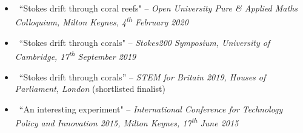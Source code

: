 \documentclass[a4paper]{article}
\begin{document}
\begin{multicols}{2}
\begin{small}
\begin{itemize}
                    \item \faVolumeUp \, ``Stokes drift through coral reefs" -- \emph{Open University Pure \& Applied Maths Colloquium, Milton Keynes, 4\textsuperscript{th} February 2020}
                    \item \faVolumeUp \, ``Stokes drift through corals" -- \emph{Stokes200 Symposium, University of Cambridge, 17\textsuperscript{th} September 2019}
                    \item \faClipboard \, ``Stokes drift through corals'' -- \emph{STEM for Britain 2019, Houses of Parliament, London} (shortlisted finalist)
                    \item \faVolumeUp \, ``An interesting experiment" -- \emph{International Conference for Technology Policy and Innovation 2015,  Milton Keynes, 17\textsuperscript{th} June 2015}
                \end{itemize}
            \end{small}
        
            \newcolumn

\end{multicols}
\end{document}
